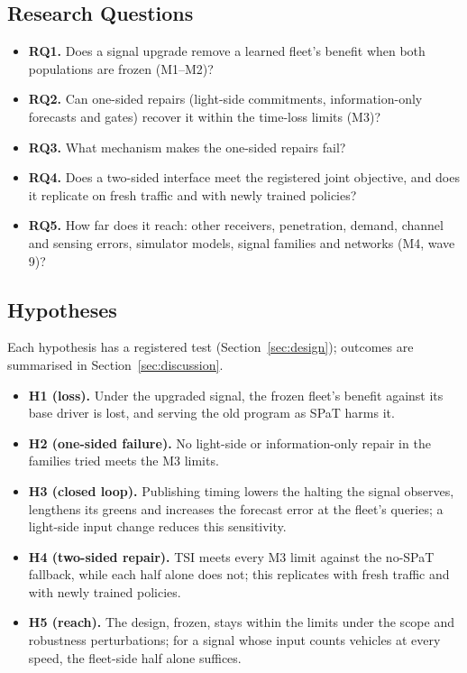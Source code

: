 \subsection{Research Questions}
\begin{itemize}\setlength\itemsep{1pt}
\item \textbf{RQ1.} Does a signal upgrade remove a learned fleet's benefit when both populations are frozen (M1--M2)?
\item \textbf{RQ2.} Can one-sided repairs (light-side commitments, information-only forecasts and gates) recover it within the time-loss
limits (M3)?
\item \textbf{RQ3.} What mechanism makes the one-sided repairs fail?
\item \textbf{RQ4.} Does a two-sided interface meet the registered joint objective, and does it replicate on fresh traffic and with newly
trained policies?
\item \textbf{RQ5.} How far does it reach: other receivers, penetration, demand, channel and sensing errors, simulator models, signal
families and networks (M4, wave 9)?
\end{itemize}

\subsection{Hypotheses}
Each hypothesis has a registered test (Section~\ref{sec:design}); outcomes are summarised in Section~\ref{sec:discussion}.
\begin{itemize}\setlength\itemsep{1pt}
\item \textbf{H1 (loss).} Under the upgraded signal, the frozen fleet's benefit against its base driver is lost, and serving the old
program as SPaT harms it.
\item \textbf{H2 (one-sided failure).} No light-side or information-only repair in the families tried meets the M3 limits.
\item \textbf{H3 (closed loop).} Publishing timing lowers the halting the signal observes, lengthens its greens and increases the
forecast error at the fleet's queries; a light-side input change reduces this sensitivity.
\item \textbf{H4 (two-sided repair).} TSI meets every M3 limit against the no-SPaT fallback, while each half alone does not; this
replicates with fresh traffic and with newly trained policies.
\item \textbf{H5 (reach).} The design, frozen, stays within the limits under the scope and robustness perturbations; for a signal whose
input counts vehicles at every speed, the fleet-side half alone suffices.
\end{itemize}

